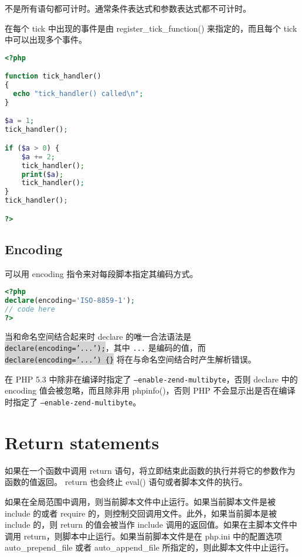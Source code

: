 不是所有语句都可计时。通常条件表达式和参数表达式都不可计时。

在每个 tick 中出现的事件是由 register\_tick\_function() 来指定的，而且每个 tick 中可以出现多个事件。

\begin{lstlisting}[language=PHP]
<?php

function tick_handler()
{
  echo "tick_handler() called\n";
}

$a = 1;
tick_handler();

if ($a > 0) {
    $a += 2;
    tick_handler();
    print($a);
    tick_handler();
}
tick_handler();

?>
\end{lstlisting}

\subsection{Encoding}

可以用 encoding 指令来对每段脚本指定其编码方式。


\begin{lstlisting}[language=PHP]
<?php
declare(encoding='ISO-8859-1');
// code here
?>
\end{lstlisting}



当和命名空间结合起来时 declare 的唯一合法语法是 \colorbox{lightgray}{\texttt{declare(encoding='...');}}，其中 \texttt{...} 是编码的值，而 \colorbox{lightgray}{\texttt{declare(encoding='...') \{\}}} 将在与命名空间结合时产生解析错误。

在 PHP 5.3 中除非在编译时指定了 \texttt{--enable-zend-multibyte}，否则 declare 中的 encoding 值会被忽略，而且除非用 phpinfo()，否则 PHP 不会显示出是否在编译时指定了 \texttt{--enable-zend-multibyte}。

\section{Return statements}

如果在一个函数中调用 return 语句，将立即结束此函数的执行并将它的参数作为函数的值返回。 return 也会终止 eval() 语句或者脚本文件的执行。

如果在全局范围中调用，则当前脚本文件中止运行。如果当前脚本文件是被 include 的或者 require 的，则控制交回调用文件。此外，如果当前脚本是被 include 的，则 return 的值会被当作 include 调用的返回值。如果在主脚本文件中调用 return，则脚本中止运行。如果当前脚本文件是在 php.ini 中的配置选项 auto\_prepend\_file 或者 auto\_append\_file 所指定的，则此脚本文件中止运行。

